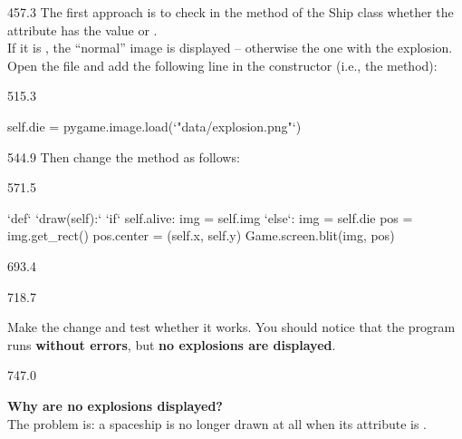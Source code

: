 \documentclass{aslab}
\newcommand*\Kw[1]{\textcolor{codeorange}{#1}}  %
\newcommand*\Cy[1]{\textcolor{codecyan}{#1}}    %
\newcommand*\Nu[1]{\textcolor{codered}{#1}}     %
\newcommand*\Bl[1]{\textcolor{aslabblue}{#1}}   %
\begin{document}
\begin{region}[pitch=13.5]{457.3}
The first approach is to check in the  method of the Ship class
whether the attribute  has the value  or
.\\
If it is , the ``normal'' image is displayed -- otherwise the one
with the explosion.\\
Open the file  and add the following line in the constructor
(i.e., the  method):
\end{region}

\begin{region}{515.3}
\begin{codeblock}[escapechar=`]
self.die = pygame.image.load(`\Nu{"data/explosion.png"}`)
\end{codeblock}
\end{region}

\begin{region}{544.9}
Then change the  method as follows:
\end{region}

\begin{region}[pitch=12]{571.5}
\begin{codeblock}[escapechar=`]
`\Kw{def}` `\Cy{draw}\Bl{(self):}`
    `\Kw{if}` self.alive:
        img = self.img
    `\Kw{else}`:
        img = self.die
    pos = img.get_rect()
    pos.center = (self.x, self.y)
    Game.screen.blit(img, pos)
\end{codeblock}
\end{region}

\begin{region}{693.4}
\end{region}

\begin{region}[pitch=14.1]{718.7}
\begin{tasks}
\item Make the change and test whether it works. You should notice that the
  program runs \textbf{without errors}, but \textbf{no explosions are
  displayed}.
\end{tasks}
\end{region}

\begin{region}[pitch=13.55]{747.0}
\begin{tasks}[start=2]
\item \textbf{Why are no explosions displayed?}\\
  The problem is: a spaceship is no longer drawn at all when its
   attribute is .
\end{tasks}
\end{region}
\end{document}
